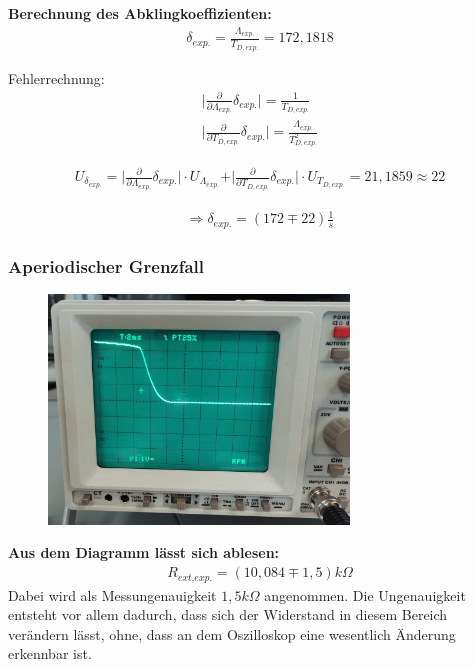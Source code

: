 \documentclass[a4paper]{scrartcl}
\numberwithin{equation}{subsection}
\begin{document}
\textbf{Berechnung des Abklingkoeffizienten:}
\begin{align}
\delta_{\textit{exp.}} = \frac{\Lambda_{\textit{exp.}}}{T_{D,\textit{exp.}}} = 172,1818
\end{align}

Fehlerrechnung:
\begin{align*}
\vert \frac{\partial}{\partial \Lambda_{\textit{exp.}}}\delta_{\textit{exp.}}\vert = \frac{1}{T_{D,\textit{exp.}}} \\
\vert \frac{\partial}{\partial T_{D,\textit{exp.}}}\delta_{\textit{exp.}}\vert = \frac{\Lambda_{\textit{exp.}}}{T_{D,\textit{exp.}}^2}
\end{align*}

\begin{align*}
U_{\delta_{\textit{exp.}}} = \vert \frac{\partial}{\partial \Lambda_{\textit{exp.}}}\delta_{\textit{exp.}}\vert \cdot U_{\Lambda_{\textit{exp.}}} + \vert \frac{\partial}{\partial T_{D,\textit{exp.}}}\delta_{\textit{exp.}}\vert \cdot U_{T_{D,\textit{exp.}}} = 21,1859 \approx 22
\end{align*}

\begin{align*}
\Rightarrow \delta_{\textit{exp.}} = (172 \mp 22) \frac{1}{s}
\end{align*}

\subsubsection{Aperiodischer Grenzfall}

\begin{figure}[H]
\includegraphics[width=8cm]{Bild_Osziloskop-Grenzfall}
\centering
\end{figure}

\textbf{Aus dem Diagramm lässt sich ablesen:}
\begin{align*}
R_{\textit{ext,exp.}} = (10,084\mp1,5)k\Omega
\end{align*}
Dabei wird als Messungenauigkeit $1,5k\Omega$ angenommen. Die Ungenauigkeit entsteht vor allem dadurch, dass sich der Widerstand in diesem Bereich verändern lässt, ohne, dass an dem Oszilloskop eine wesentlich Änderung erkennbar ist.
\end{document}
